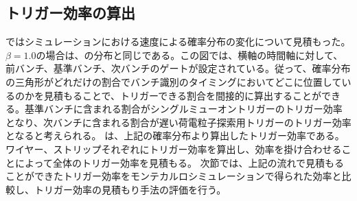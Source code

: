 \subsection{トリガー効率の算出}\label{sec:prot}
ではシミュレーションにおける速度による確率分布の変化について見積もった。$\beta=1.0$の場合は、の分布と同じである。この図では、横軸の時間軸に対して、前バンチ、基準バンチ、次バンチのゲートが設定されている。従って、確率分布の三角形がどれだけの割合でバンチ識別のタイミングにおいてどこに位置しているのかを見積もることで、トリガーできる割合を間接的に算出することができる。基準バンチに含まれる割合がシングルミューオントリガーのトリガー効率となり、次バンチに含まれる割合が遅い荷電粒子探索用トリガーのトリガー効率となると考えられる。
は、上記の確率分布より算出したトリガー効率である。ワイヤー、ストリップそれぞれにトリガー効率を算出し、効率を掛け合わせることによって全体のトリガー効率を見積もる。
次節では、上記の流れで見積もることができたトリガー効率をモンテカルロシミュレーションで得られた効率と比較し、トリガー効率の見積もり手法の評価を行う。
